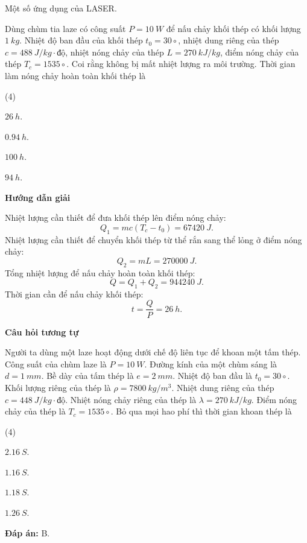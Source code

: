 \begin{dang}{Một số ứng dụng của LASER.}
	{
		Dùng chùm tia laze có công suất $ P = \SI{10}{W} $ để nấu chảy khối thép có khối lượng $ \SI{1}{kg} $. Nhiệt độ ban đầu của khối thép $ t_{0} = 30\circ $, nhiệt dung riêng của thép $ c = \SI{488}{J/kg \cdot \text{độ}} $, nhiệt nóng chảy của thép $ L = \SI{270}{kJ/kg} $, điểm nóng chảy của thép $ T_{c} = 1535\circ $. Coi rằng không bị mất nhiệt lượng ra môi trường. Thời gian làm nóng chảy hoàn toàn khối thép là
		\begin{mcq}(4)
			\item $ \SI{26}{h} $.
			\item $ \SI{0,94}{h} $.
			\item $ \SI{100}{h} $.
			\item $ \SI{94}{h} $.
		\end{mcq}
	}
	{
		\begin{center}
			\textbf{Hướng dẫn giải}
		\end{center}
		Nhiệt lượng cần thiết để đưa khối thép lên điểm nóng chảy:
		$$
		Q_{1} = mc\left( T_{c} - t_{0} \right) = \SI{67420}{J}.
		$$
		Nhiệt lượng cần thiết để chuyển khối thép từ thể rắn sang thể lỏng ở điểm nóng chảy:
		$$
		Q_{2} = mL = \SI{270000}{J}.
		$$
		Tổng nhiệt lượng để nấu chảy hoàn toàn khối thép:
		$$
		Q = Q_{1} + Q_{2} = \SI{944240}{J}.
		$$
		Thời gian cần để nấu chảy khối thép:
		$$
		t = \dfrac{Q}{P} = \SI{26}{h}.
		$$
		
		\begin{center}
			\textbf{Câu hỏi tương tự}
		\end{center}
		Người ta dùng một laze hoạt động dưới chế độ liên tục để khoan một tấm thép. Công suất của chùm laze là $ P = \SI{10}{W} $. Đường kính của một chùm sáng là $ d = \SI{1}{mm} $. Bề dày của tấm thép là $ e = \SI{2}{mm} $. Nhiệt độ ban đầu là $ t_{0} = 30\circ $. Khối lượng riêng của thép là $ \rho = \SI{7800}{kg/m^{3}} $. Nhiệt dung riêng của thép $ c = \SI{448}{J/kg \cdot \text{độ}} $. Nhiệt nóng chảy riêng của thép là $ \lambda = \SI{270}{kJ/kg} $. Điểm nóng chảy của thép là $ T_{c} = 1535\circ $. Bỏ qua mọi hao phí thì thời gian khoan thép là
		\begin{mcq}(4)
			\item $ \SI{2,16}{S} $.
			\item $ \SI{1,16}{S} $.
			\item $ \SI{1,18}{S} $.
			\item $ \SI{1,26}{S} $.
		\end{mcq}
		\textbf{Đáp án:} B.
	}
	
\end{dang}
